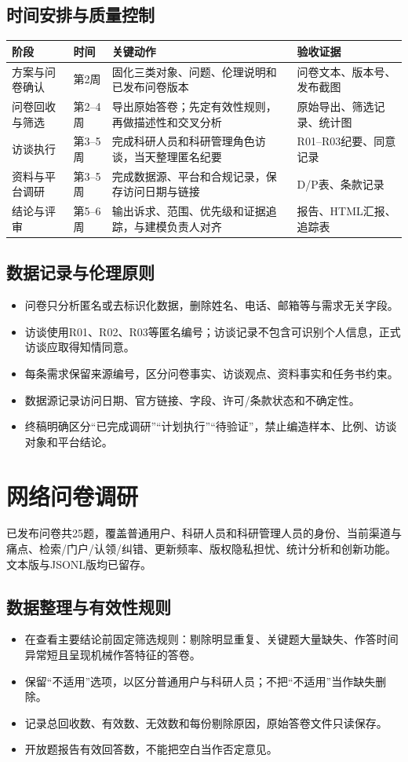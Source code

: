 \documentclass[UTF8,11pt,a4paper]{ctexart}
\begin{document}
\subsection{时间安排与质量控制}
\begin{longtable}{p{2.3cm}p{2.7cm}p{6.7cm}p{2.4cm}}
\toprule 阶段 & 时间 & 关键动作 & 验收证据\\\midrule
方案与问卷确认 & 第2周 & 固化三类对象、问题、伦理说明和已发布问卷版本 & 问卷文本、版本号、发布截图\\
问卷回收与筛选 & 第2--4周 & 导出原始答卷；先定有效性规则，再做描述性和交叉分析 & 原始导出、筛选记录、统计图\\
访谈执行 & 第3--5周 & 完成科研人员和科研管理角色访谈，当天整理匿名纪要 & R01--R03纪要、同意记录\\
资料与平台调研 & 第3--5周 & 完成数据源、平台和合规记录，保存访问日期与链接 & D/P表、条款记录\\
结论与评审 & 第5--6周 & 输出诉求、范围、优先级和证据追踪，与建模负责人对齐 & 报告、HTML汇报、追踪表\\\bottomrule
\end{longtable}

\subsection{数据记录与伦理原则}
\begin{itemize}
\item 问卷只分析匿名或去标识化数据，删除姓名、电话、邮箱等与需求无关字段。
\item 访谈使用R01、R02、R03等匿名编号；访谈记录不包含可识别个人信息，正式访谈应取得知情同意。
\item 每条需求保留来源编号，区分问卷事实、访谈观点、资料事实和任务书约束。
\item 数据源记录访问日期、官方链接、字段、许可/条款状态和不确定性。
\item 终稿明确区分“已完成调研”“计划执行”“待验证”，禁止编造样本、比例、访谈对象和平台结论。
\end{itemize}

\section{网络问卷调研}
已发布问卷共25题，覆盖普通用户、科研人员和科研管理人员的身份、当前渠道与痛点、检索/门户/认领/纠错、更新频率、版权隐私担忧、统计分析和创新功能。文本版与JSONL版均已留存。

\subsection{数据整理与有效性规则}
\begin{itemize}
\item 在查看主要结论前固定筛选规则：剔除明显重复、关键题大量缺失、作答时间异常短且呈现机械作答特征的答卷。
\item 保留“不适用”选项，以区分普通用户与科研人员；不把“不适用”当作缺失删除。
\item 记录总回收数、有效数、无效数和每份剔除原因，原始答卷文件只读保存。
\item 开放题报告有效回答数，不能把空白当作否定意见。
\end{itemize}
\end{document}
